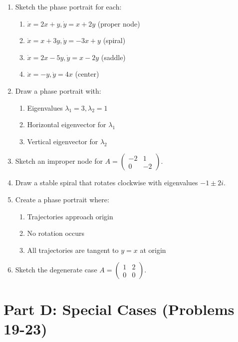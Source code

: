 \documentclass[12pt]{article}
\begin{document}
\begin{enumerate}[resume]
\item Sketch the phase portrait for each:
\begin{enumerate}[label=(\alph*)]
    \item $\dot{x} = 2x + y, \dot{y} = x + 2y$ (proper node)
    \item $\dot{x} = x + 3y, \dot{y} = -3x + y$ (spiral)
    \item $\dot{x} = 2x - 5y, \dot{y} = x - 2y$ (saddle)
    \item $\dot{x} = -y, \dot{y} = 4x$ (center)
\end{enumerate}

\item Draw a phase portrait with:
\begin{enumerate}[label=(\alph*)]
    \item Eigenvalues $\lambda_{1} = 3, \lambda_{2} = 1$
    \item Horizontal eigenvector for $\lambda_{1}$
    \item Vertical eigenvector for $\lambda_{2}$
\end{enumerate}

\item Sketch an improper node for $A = \begin{pmatrix} -2 & 1 \\ 0 & -2 \end{pmatrix}$.

\item Draw a stable spiral that rotates clockwise with eigenvalues $-1 \pm 2i$.

\item Create a phase portrait where:
\begin{enumerate}[label=(\alph*)]
    \item Trajectories approach origin
    \item No rotation occurs
    \item All trajectories are tangent to $y = x$ at origin
\end{enumerate}

\item Sketch the degenerate case $A = \begin{pmatrix} 1 & 2 \\ 0 & 0 \end{pmatrix}$.
\end{enumerate}

\section*{Part D: Special Cases (Problems 19-23)}
\end{document}

